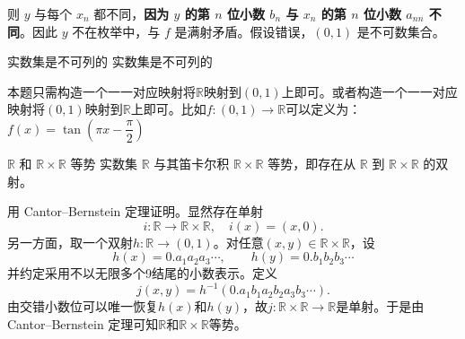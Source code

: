 则 $y$ 与每个 $x_n$ 都不同，\textbf{因为 $y$ 的第 $n$ 位小数 $b_n$ 与 $x_n$ 的第 $n$ 位小数 $a_{nn}$ 不同}。因此 $y$ 不在枚举中，与 $f$ 是满射矛盾。假设错误，$(0,1)$ 是不可数集合。
\begin{theorem}{实数集是不可列的}{}
实数集是不可列的
\end{theorem}
本题只需构造一个一一对应映射将$\mathbb{R}$映射到$(0,1)$上即可。或者构造一个一一对应映射将$(0,1)$映射到$\mathbb{R}$上即可。比如$f: (0,1) \to \mathbb{R}$可以定义为：$f(x)=\tan\left(\pi x-\dfrac{\pi}{2}\right)$
\begin{theorem}{$\mathbb{R}$ 和 $\mathbb{R} \times \mathbb{R}$ 等势}{}
    实数集 $\mathbb{R}$ 与其笛卡尔积 $\mathbb{R} \times \mathbb{R}$ 等势，即存在从 $\mathbb{R}$ 到 $\mathbb{R} \times \mathbb{R}$ 的双射。
\end{theorem}
用 Cantor--Bernstein 定理证明。显然存在单射
\[
i:\mathbb{R}\to\mathbb{R}\times\mathbb{R},\quad i(x)=(x,0).
\]
另一方面，取一个双射$h:\mathbb{R}\to(0,1)$。对任意$(x,y)\in\mathbb{R}\times\mathbb{R}$，设
\[
h(x)=0.a_1a_2a_3\cdots,\qquad h(y)=0.b_1b_2b_3\cdots
\]
并约定采用不以无限多个9结尾的小数表示。定义
\[
j(x,y)=h^{-1}(0.a_1b_1a_2b_2a_3b_3\cdots).
\]
由交错小数位可以唯一恢复$h(x)$和$h(y)$，故$j:\mathbb{R}\times\mathbb{R}\to\mathbb{R}$是单射。于是由 Cantor--Bernstein 定理可知$\mathbb{R}$和$\mathbb{R}\times\mathbb{R}$等势。

